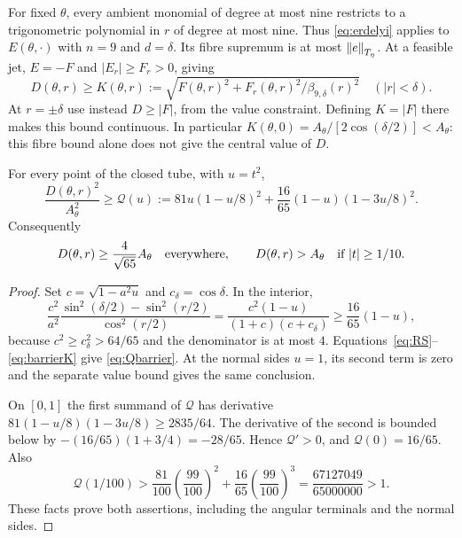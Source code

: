 \documentclass[11pt,a4paper]{article}
\begin{document}
For fixed $\theta$, every ambient monomial of degree at most nine
restricts to a trigonometric polynomial in $r$ of degree at most nine.
Thus \eqref{eq:erdelyi} applies to $E(\theta,\cdot)$ with $n=9$ and
$d=\delta$. Its fibre supremum is at most $\left\lVert e\right\rVert_{T_\eta}$. At a feasible
jet, $E=-F$ and $|E_r|\ge F_r>0$, giving
\begin{equation}\label{eq:barrierK}
 D(\theta,r)\ge
 K(\theta,r):=\sqrt{F(\theta,r)^2+
                F_r(\theta,r)^2/\beta_{9,\delta}(r)^2}
       \quad(|r|<\delta).
\end{equation}
At $r=\pm\delta$ use instead $D\ge|F|$, from the value constraint.
Defining $K=|F|$ there makes this bound continuous. In particular
$K(\theta,0)=A_\theta/[2\cos(\delta/2)]<A_\theta$: this fibre
bound alone does not give the central value of $D$.

\begin{proposition}\label{prop:barrier}
For every point of the closed tube, with $u=t^2$,
\begin{equation}\label{eq:Qbarrier}
 \frac{D(\theta,r)^2}{A_\theta^2}\ge
 \mathcal Q(u):=81u(1-u/8)^2+
                 \frac{16}{65}(1-u)(1-3u/8)^2.
\end{equation}
Consequently
\begin{equation}\label{eq:barrierconsequences}
 D(\theta,r)\ge\frac4{\sqrt{65}}A_\theta
 \quad\hbox{everywhere},\qquad
 D(\theta,r)>A_\theta\quad\hbox{if }|t|\ge1/10.
\end{equation}
\end{proposition}
\begin{proof}
Set
$c=\sqrt{1-a^2u}$ and $c_\delta=\cos\delta$. In the interior,
\[
 \frac{c^2}{a^2}
 \frac{\sin^2(\delta/2)-\sin^2(r/2)}{\cos^2(r/2)}
 =\frac{c^2(1-u)}{(1+c)(c+c_\delta)}
 \ge\frac{16}{65}(1-u),
\]
because $c^2\ge c_\delta^2>64/65$ and the denominator is at most
$4$. Equations~\eqref{eq:RS}--\eqref{eq:barrierK} give
\eqref{eq:Qbarrier}. At the normal sides $u=1$, its second term is
zero and the separate value bound gives the same conclusion.

On $[0,1]$ the first summand of $\mathcal Q$ has derivative
$81(1-u/8)(1-3u/8)\ge2835/64$. The derivative of the second is
bounded below by $-(16/65)(1+3/4)=-28/65$. Hence
$\mathcal Q'>0$, and $\mathcal Q(0)=16/65$. Also
\[
 \mathcal Q(1/100)>
 \frac{81}{100}\left(\frac{99}{100}\right)^2+
 \frac{16}{65}\left(\frac{99}{100}\right)^3
 =\frac{67127049}{65000000}>1.
\]
These facts prove both assertions, including the angular terminals and
the normal sides.
\end{proof}
\end{document}
